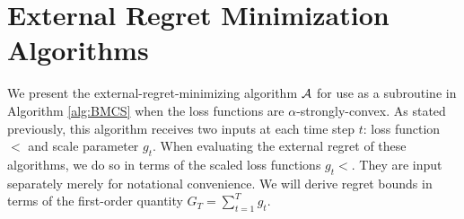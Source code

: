 \section{External Regret Minimization Algorithms}\label{appendix:external_regret}


We present the external-regret-minimizing algorithm $\mathcal{A}$ for use as a subroutine in Algorithm \ref{alg:BMCS} when the loss functions are $\alpha$-strongly-convex.  As stated previously, this algorithm receives two inputs at each time step $t$: loss function $\lt$ and scale parameter $g_t$.  When evaluating the external regret of these algorithms, we do so in terms of the scaled loss functions $g_t\lt$.  They are input separately merely for notational convenience.  We will derive regret bounds in terms of the first-order quantity $G_T = \sum_{t=1}^T g_t$.

































































































